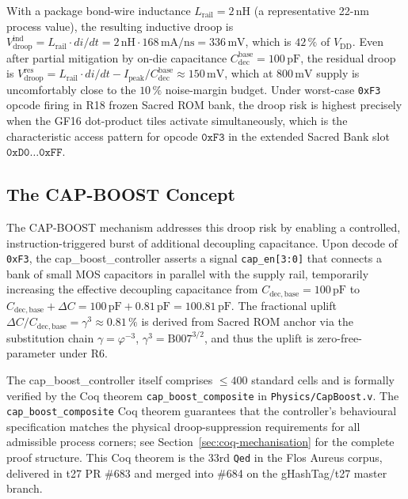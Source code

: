 \documentclass[12pt,a4paper]{report}
\theoremstyle{plain}
\theoremstyle{definition}
\theoremstyle{remark}
\newcommand{\Vdd}{V_{\mathrm{DD}}}
\newcommand{\Vdroop}{V_{\mathrm{droop}}}
\newcommand{\Lrail}{L_{\mathrm{rail}}}
\newcommand{\Cdec}{C_{\mathrm{dec}}}
\newcommand{\Cbase}{C_{\mathrm{dec,base}}}
\newcommand{\deltaC}{\Delta C}
\newcommand{\Ipeak}{I_{\mathrm{peak}}}
\newcommand{\Bseven}{\mathrm{B007}}
\begin{document}
With a package bond-wire inductance $\Lrail = 2\,\mathrm{nH}$
(a representative 22-nm process value), the resulting inductive droop is
$\Vdroop^{\mathrm{ind}} = \Lrail \cdot di/dt
   = 2\,\mathrm{nH} \cdot 168\,\mathrm{mA/ns} = 336\,\mathrm{mV}$,
which is $42\,\%$ of $\Vdd$.
Even after partial mitigation by on-die capacitance
$\Cdec^{\mathrm{base}} = 100\,\mathrm{pF}$, the residual droop is
$\Vdroop^{\mathrm{res}} = \Lrail \cdot di/dt - \Ipeak / \Cdec^{\mathrm{base}}
   \approx 150\,\mathrm{mV}$,
which at $800\,\mathrm{mV}$ supply is uncomfortably close to the $10\,\%$
noise-margin budget.
Under worst-case \texttt{0xF3} opcode firing in R18 frozen Sacred ROM bank,
the droop risk is highest precisely when the GF16 dot-product tiles activate
simultaneously, which is the characteristic access pattern for opcode
$\texttt{0xF3}$ in the extended Sacred Bank slot
$\texttt{0xD0}\ldots\texttt{0xFF}$.

\subsection{The CAP-BOOST Concept}
\label{ssec:capboost-concept}

The CAP-BOOST mechanism addresses this droop risk by enabling a controlled,
instruction-triggered burst of additional decoupling capacitance.
Upon decode of \texttt{0xF3}, the cap\_boost\_controller asserts a signal
\texttt{cap\_en[3:0]} that connects a bank of small MOS capacitors in
parallel with the supply rail, temporarily increasing the effective
decoupling capacitance from $\Cbase = 100\,\mathrm{pF}$ to
$\Cbase + \deltaC = 100\,\mathrm{pF} + 0.81\,\mathrm{pF} = 100.81\,\mathrm{pF}$.
The fractional uplift $\deltaC / \Cbase = \gamma^{3} \approx 0.81\,\%$
is derived from Sacred ROM anchor \Bseven{} via the substitution chain
$\gamma = \varphi^{-3}$, $\gamma^{3} = \Bseven^{3/2}$, and thus the
uplift is zero-free-parameter under R6.

The cap\_boost\_controller itself comprises $\leq 400$ standard cells and
is formally verified by the Coq theorem \texttt{cap\_boost\_composite}
in \texttt{Physics/CapBoost.v}.
The \texttt{cap\_boost\_composite} Coq theorem guarantees that the controller's
behavioural specification matches the physical droop-suppression requirements
for all admissible process corners; see Section~\ref{sec:coq-mechanisation} for
the complete proof structure.
This Coq theorem is the 33rd \texttt{Qed} in the Flos Aureus corpus,
delivered in t27 PR \#683 and merged into \#684 on the gHashTag/t27
master branch.
\end{document}
